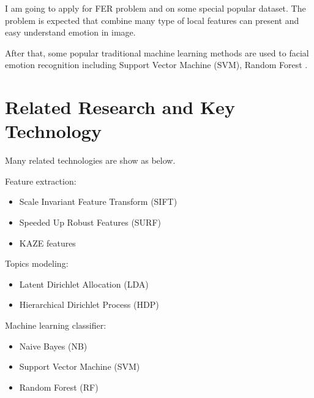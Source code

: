 \documentclass[12pt]{article}
\begin{document}
I am going to apply for FER problem and on some special popular dataset.
The problem is expected that combine many type of local features can present and easy understand emotion in image.

After that, some popular traditional machine learning methods are used to facial emotion recognition including Support Vector Machine \cite{suykens1999least} (SVM), Random Forest \cite{liaw2002classification}.

\section{Related Research and Key Technology}
Many related technologies are show as below.


Feature extraction:
\begin{itemize}
    \item Scale Invariant Feature Transform \cite{Lowe2004} (SIFT)
    \item Speeded Up Robust Features \cite{Bay06} (SURF)
    \item KAZE features \cite{alcantarilla2012kaze}
\end{itemize}


Topics modeling:
\begin{itemize}
    \item Latent Dirichlet Allocation \cite{blei2003latent, Blei2003} (LDA)
    \item Hierarchical Dirichlet Process \cite{teh2005sharing} (HDP)
\end{itemize}

Machine learning classifier:
\begin{itemize}
    \item Naive Bayes (NB)
    \item Support Vector Machine \cite{suykens1999least} (SVM)
    \item Random Forest \cite{liaw2002classification} (RF)
\end{itemize}
\end{document}
